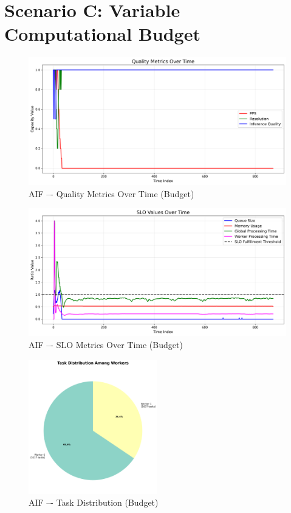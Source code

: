 \clearpage
\section{Scenario C: Variable Computational Budget}





\begin{figure}[h]
    \centering
    \includegraphics[width=\textwidth]{img/results/variable_computational_budget/active_inference_relative_control_quality_metrics.png}
    \caption{AIF –- Quality Metrics Over Time (Budget)}
\end{figure}
\begin{figure}[h]
    \centering
    \includegraphics[width=\textwidth]{img/results/variable_computational_budget/active_inference_relative_control_slo_values.png}
    \caption{AIF –- SLO Metrics Over Time (Budget)}
\end{figure}
\begin{figure}[h]
    \centering
    \includegraphics[width=0.5\textwidth]{img/results/variable_computational_budget/active_inference_relative_control_task_distribution_pie.png}
    \caption{AIF –- Task Distribution (Budget)}
\end{figure}


